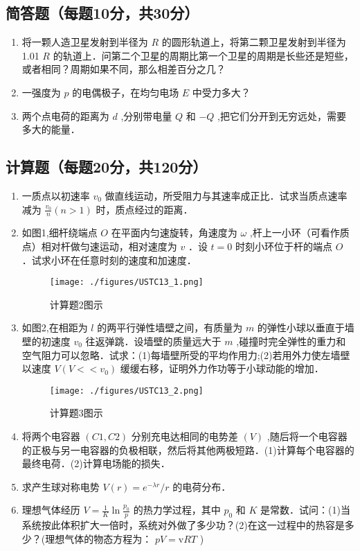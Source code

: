 

\subsection{ 简答题（每题10分，共30分）}
\begin{enumerate}
\item 将一颗人造卫星发射到半径为 $R$ 的圆形轨道上，将第二颗卫星发射到半径为1.01 $R$ 的轨道上．问第二个卫星的周期比第一个卫星的周期是长些还是短些，或者相同？周期如果不同，那么相差百分之几？

\item 一强度为 $p$ 的电偶极子，在均匀电场 $E$ 中受力多大？

\item 两个点电荷的距离为 $d$ ,分别带电量 $Q$ 和 $-Q$ ,把它们分开到无穷远处，需要多大的能量．
\end{enumerate}
\subsection{计算题（每题20分，共120分）}
\begin{enumerate}
\item 一质点以初速率 $v_0$ 做直线运动，所受阻力与其速率成正比．试求当质点速率减为 $\frac{v_0}{n}(n>1)$ 时，质点经过的距离．

\item 如图1,细杆绕端点 $O$ 在平面内匀速旋转，角速度为 $\omega$ ,杆上一小环（可看作质点）相对杆做匀速运动，相对速度为 $v$ ．设 $t=0$ 时刻小环位于杆的端点 $O$ ．试求小环在任意时刻的速度和加速度．\\
\begin{figure}[ht]
\centering
\texttt{[image: ./figures/USTC13\_1.png]}
\caption{计算题2图示} \label{USTC13_fig1}
\end{figure}

\item 如图2,在相距为 $l$ 的两平行弹性墙壁之间，有质量为 $m$ 的弹性小球以垂直于墙壁的初速度 $v_0$ 往返弹跳．设墙壁的质量远大于 $m$ ,碰撞时完全弹性的重力和空气阻力可以忽略．试求：(1)每墙壁所受的平均作用力;(2)若用外力使左墙壁以速度 $V(V<<v_0)$ 缓缓右移，证明外力作功等于小球动能的增加．\\
\begin{figure}[ht]
\centering
\texttt{[image: ./figures/USTC13\_2.png]}
\caption{计算题3图示} \label{USTC13_fig2}
\end{figure}

\item 将两个电容器 $(C1,C2)$ 分别充电达相同的电势差 $(V)$ ,随后将一个电容器的正极与另一电容器的负极相联，然后将其他两极短路．(1)计算每个电容器的最终电荷．(2)计算电场能的损失．

\item 求产生球对称电势 $V(r)=e^{-\lambda r}/r$ 的电荷分布．

\item 理想气体经历 $V=\frac{1}{K} \ln \frac{p_{0}}{p}$ 的热力学过程，其中 $p_0$ 和 $K$ 是常数．试问：(1)当系统按此体积扩大一倍时，系统对外做了多少功？(2)在这一过程中的热容是多少？(理想气体的物态方程为： $pV=\mathrm v RT$ )
\end{enumerate}

